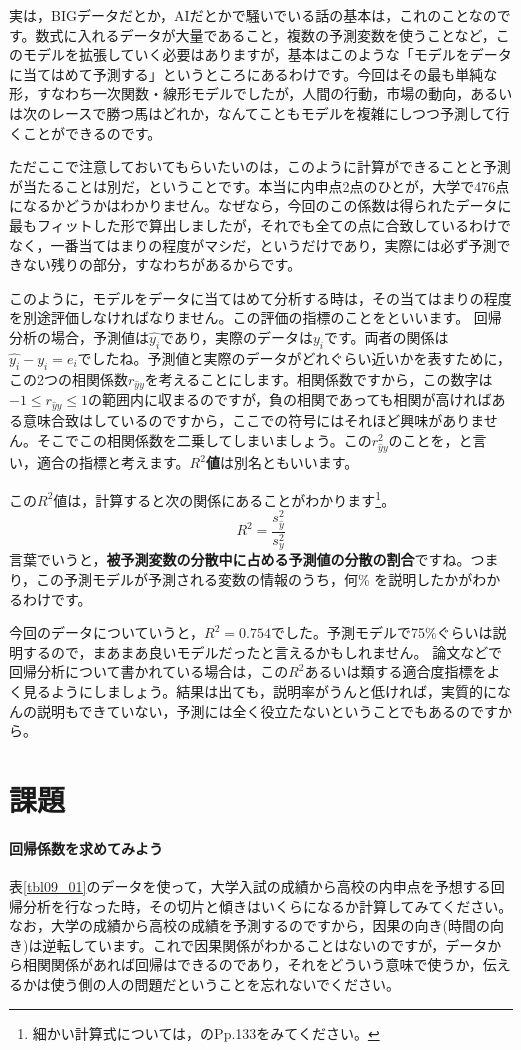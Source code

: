 \documentclass{ltjbook}
\begin{document}
実は，BIGデータだとか，AIだとかで騒いでいる話の基本は，これのことなのです。数式に入れるデータが大量であること，複数の予測変数を使うことなど，このモデルを拡張していく必要はありますが，基本はこのような「モデルをデータに当てはめて予測する」というところにあるわけです。今回はその最も単純な形，すなわち一次関数・線形モデルでしたが，人間の行動，市場の動向，あるいは次のレースで勝つ馬はどれか，なんてこともモデルを複雑にしつつ予測して行くことができるのです。

ただここで注意しておいてもらいたいのは，このように計算ができることと予測が当たることは別だ，ということです。本当に内申点2点のひとが，大学で476点になるかどうかはわかりません。なぜなら，今回のこの係数は得られたデータに最もフィットした形で算出しましたが，それでも全ての点に合致しているわけでなく，一番当てはまりの程度がマシだ，というだけであり，実際には必ず予測できない残りの部分，すなわちがあるからです。

このように，モデルをデータに当てはめて分析する時は，その当てはまりの程度を別途評価しなければなりません。この評価の指標のことをといいます。
回帰分析の場合，予測値は$\hat{y_i}$であり，実際のデータは$y_i$です。両者の関係は$\hat{y_i}-y_i=e_i$でしたね。予測値と実際のデータがどれぐらい近いかを表すために，この2つの相関係数$r_{\hat{y}y}$を考えることにします。相関係数ですから，この数字は$-1\le r_{\hat{y}y} \le 1$の範囲内に収まるのですが，負の相関であっても相関が高ければある意味合致はしているのですから，ここでの符号にはそれほど興味がありません。そこでこの相関係数を二乗してしまいましょう。この$r_{\hat{y}y}^2$のことを，と言い，適合の指標と考えます。\textbf{$R^2$値}は別名ともいいます。

この$R^2$値は，計算すると次の関係にあることがわかります\footnote{細かい計算式については，\citet{kosugi2018}のPp.133をみてください。}。
\[ R^2 = \frac{s_{\hat{y}}^2}{s_y^2} \]
言葉でいうと，\textbf{被予測変数の分散中に占める予測値の分散の割合}ですね。つまり，この予測モデルが予測される変数の情報のうち，何\% を説明したかがわかるわけです。

今回のデータについていうと，$R^2=0.754$でした。予測モデルで75\%ぐらいは説明するので，まあまあ良いモデルだったと言えるかもしれません。
論文などで回帰分析について書かれている場合は，この$R^2$あるいは類する適合度指標をよく見るようにしましょう。結果は出ても，説明率がうんと低ければ，実質的になんの説明もできていない，予測には全く役立たないということでもあるのですから。

\section{課題}
\paragraph{回帰係数を求めてみよう}表\ref{tbl09_01}のデータを使って，大学入試の成績から高校の内申点を予想する回帰分析を行なった時，その切片と傾きはいくらになるか計算してみてください。なお，大学の成績から高校の成績を予測するのですから，因果の向き(時間の向き)は逆転しています。これで因果関係がわかることはないのですが，データから相関関係があれば回帰はできるのであり，それをどういう意味で使うか，伝えるかは使う側の人の問題だということを忘れないでください。
\end{document}
